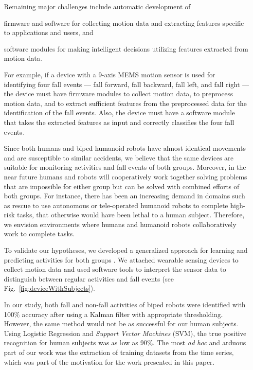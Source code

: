 \documentclass[]{IEEEtran}
\begin{document}
\par
Remaining major challenges include automatic development of
\begin{inparaenum}[($i$)] \item firmware and software for collecting motion
data and  extracting features specific to applications and users, and \item
software modules for making intelligent decisions utilizing features extracted
from motion data. \end{inparaenum} For example, if a device with a 9-axis MEMS
motion sensor is used for identifying four fall events --- fall forward,
fall backward, fall left, and fall right --- the device must have firmware
modules to collect motion data, to preprocess motion data, and to extract
sufficient features from the preprocessed data for the identification of the fall
events. Also, the device must have a software module that takes the extracted
features as input and  correctly classifies the four fall events.

\par Since both humans and biped humanoid robots have almost identical
movements and are susceptible to similar accidents, we believe that the same
devices are suitable for monitoring activities and fall events of both groups.
Moreover, in the near future humans and robots will cooperatively work together
solving problems that are impossible for either group but can be solved with
combined efforts of both groups.  For instance, there has been an increasing
demand in domains such as rescue to use autonomous or tele-operated humanoid
robots to complete high-risk tasks, that otherwise would have been lethal to a
human subject. Therefore, we envision environments where humans and humanoid
robots collaboratively work to complete tasks. 

\par To validate our hypotheses, we developed a generalized approach for
learning and predicting activities for both groups \cite{abeyruwanFlairs2015}.
We attached wearable sensing devices to collect motion data and used software
tools to interpret the sensor data to distinguish between regular activities
and fall events (see Fig.~\ref{fig:deviceWithSubjects}). 

In our study, both fall and non-fall activities of biped robots were identified with
100\%  accuracy after using a Kalman filter \cite{Welch:1995:IKF:897831} with
appropriate thresholding. However, the same method would not be as successful for our human
subjects. Using Logistic Regression and \emph{Support Vector
Machines} (SVM), the true positive recognition for human subjects was as low as
90\%\cite{abeyruwanFlairs2015}. The most \emph{ad hoc} and arduous part of our
work was the extraction of training datasets from the time series, which was part
of the motivation for the work presented in this paper.
\end{document}
